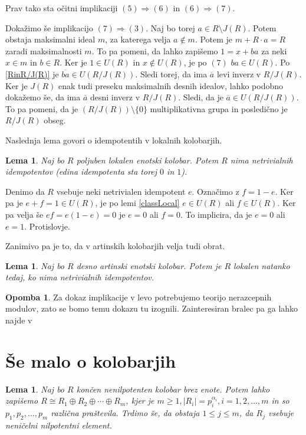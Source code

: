 \documentclass[a4paper, 12pt]{amsart}
\theoremstyle{definition} %
\newtheorem{opomba}[definicija]{Opomba}
\theoremstyle{plain} %
\newtheorem{lema}[definicija]{Lema}
\begin{document}
Prav tako sta očitni implikaciji $(5) \Rightarrow (6) $ in $(6) \Rightarrow (7)$. 

Dokažimo še implikacijo $(7) \Rightarrow (3)$. Naj bo torej $a\in R\setminus J(R)$. Potem obstaja maksimalni ideal $m$, za katerega velja $a\notin m$. Potem je $m+ R\cdot a = R$ zaradi maksimalnosti $m$. To pa pomeni, da lahko zapišemo $1 = x+ba$ za neki $x\in m$ in $b\in R$. Ker je $1\in U(R)$ in $x\notin U(R)$, je po $(7)$ $ba \in U(R)$. Po \ref{RinR/J(R)} je $\overline{ba} \in U(R/J(R))$. Sledi torej, da ima $\overline{a}$ levi inverz v $R/J(R)$. Ker je $J(R)$ enak tudi preseku maksimalnih desnih idealov, lahko podobno dokažemo še, da ima $\overline{a}$ desni inverz v $R/J(R)$. Sledi, da je $\overline{a}\in U(R/J(R))$. To pa pomeni, da je $(R/J(R)) \setminus \{0\}$ multiplikativna grupa in posledično je $R/J(R) $ obseg.
\endproof

Naslednja lema govori o idempotentih v lokalnih kolobarjih.
\begin{lema}
Naj bo $R$ poljuben lokalen enotski kolobar. Potem $R$ nima netrivialnih idempotentov (edina idempotenta sta torej $0$ in $1$).
\end{lema}

\proof
Denimo da $R$ vsebuje neki netrivialen idempotent $e$. Označimo z $f=1-e$. Ker pa je $e+f = 1\in U(R)$, je po lemi \ref{classLocal} $e\in U(R)$ ali $f\in U(R)$. Ker pa velja še $ef = e(1-e) = 0$ je $e=0$ ali $f=0$. To implicira, da je $e=0$ ali $e=1$. Protislovje. 
\endproof

Zanimivo pa je to, da v artinskih kolobarjih velja tudi obrat.

\begin{lema}
\label{localIffNoIdemp}
Naj bo $R$ desno artinski enotski kolobar. Potem je $R$ lokalen natanko tedaj, ko nima netrivialnih idempotentov.
\end{lema}

\begin{opomba}
Za dokaz implikacije v levo potrebujemo teorijo nerazcepnih modulov, zato se bomo temu dokazu tu izognili. Zainteresiran bralec pa ga lahko najde v \cite[Corollary 19.19]{Lam}
\end{opomba}

\section{Še malo o kolobarjih}

\begin{lema}
\label{nilpotent}
Naj bo $R$ končen nenilpotenten kolobar brez enote. Potem lahko zapišemo $R\cong R_1 \oplus R_2 \oplus \cdots \oplus R_m$, kjer je $m \ge 1, |R_i| = p_i^{\alpha_i}, i=1, 2, \dots, m$ in so $p_1,p_2,\dots,p_m$ različna praštevila. Trdimo še, da obstaja $1 \le j \le m$, da $R_j$ vsebuje neničelni nilpotentni element.
\end{lema}
\end{document}

